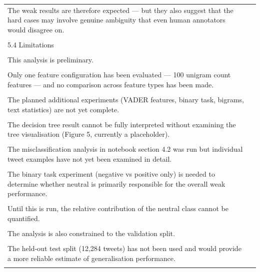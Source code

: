 \documentclass[11pt]{article}
\begin{document}
\begin{longtable}{|p{}|p{}|}
\hline
\rule{0pt}{3.5cm} & \\
\hline
The weak results are therefore expected --- but they also suggest that the hard cases may involve genuine ambiguity that even human annotators would disagree on. & \\[2pt]
\hline
\rule{0pt}{3.5cm} & \\
\hline
5.4 Limitations & \\[2pt]
\hline
\rule{0pt}{3.5cm} & \\
\hline
This analysis is preliminary. & \\[2pt]
\hline
\rule{0pt}{3.5cm} & \\
\hline
Only one feature configuration has been evaluated --- 100 unigram count features --- and no comparison across feature types has been made. & \\[2pt]
\hline
\rule{0pt}{3.5cm} & \\
\hline
The planned additional experiments (VADER features, binary task, bigrams, text statistics) are not yet complete. & \\[2pt]
\hline
\rule{0pt}{3.5cm} & \\
\hline
The decision tree result cannot be fully interpreted without examining the tree visualisation (Figure 5, currently a placeholder). & \\[2pt]
\hline
\rule{0pt}{3.5cm} & \\
\hline
The misclassification analysis in notebook section 4.2 was run but individual tweet examples have not yet been examined in detail. & \\[2pt]
\hline
\rule{0pt}{3.5cm} & \\
\hline
The binary task experiment (negative vs positive only) is needed to determine whether neutral is primarily responsible for the overall weak performance. & \\[2pt]
\hline
\rule{0pt}{3.5cm} & \\
\hline
Until this is run, the relative contribution of the neutral class cannot be quantified. & \\[2pt]
\hline
\rule{0pt}{3.5cm} & \\
\hline
The analysis is also constrained to the validation split. & \\[2pt]
\hline
\rule{0pt}{3.5cm} & \\
\hline
The held-out test split (12,284 tweets) has not been used and would provide a more reliable estimate of generalisation performance. & \\[2pt]
\hline
\rule{0pt}{3.5cm} & \\

\end{longtable}
\end{document}
